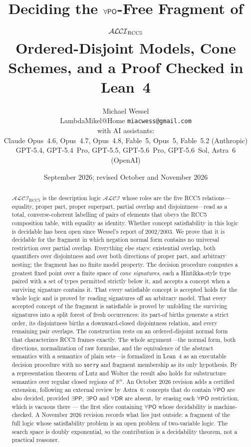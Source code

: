 \documentclass[11pt]{article}
\title{Deciding the $\forall\PO$-Free Fragment of $\ALCIRCC{5}$\\[0.35em]
\large Ordered-Disjoint Models, Cone Schemes, and a Proof Checked in Lean~4}
\author{Michael Wessel\\
\small LambdaMikel@Home \quad\textbullet\quad \texttt{miacwess@gmail.com}\\[0.45em]
\small with AI assistants:\\
\small Claude Opus~4.6, Opus~4.7, Opus~4.8, Fable~5, Opus~5, Fable~5.2 \;(Anthropic)\\
\small GPT-5.4, GPT-5.4~Pro, GPT-5.5, GPT-5.6~Pro, GPT-5.6~Sol, Astra~6 \;(OpenAI)}
\date{September 2026; revised October and November 2026}
\newcommand{\ALCIRCC}[1]{\mathcal{ALCI}_{\mathrm{RCC#1}}}
\newcommand{\ALCI}{\ensuremath{\mathcal{ALCI}}}
\newcommand{\DR}{\mathsf{DR}}
\newcommand{\PO}{\mathsf{PO}}
\newcommand{\PP}{\mathsf{PP}}
\newcommand{\reals}{\mathbb{R}}
\theoremstyle{plain}
\theoremstyle{definition}
\begin{document}
\maketitle

\begin{abstract}
$\ALCIRCC{5}$ is the description logic $\ALCI$ whose roles are the five RCC5
relations---equality, proper part, proper superpart, partial overlap and
disjointness---read as a total, converse-coherent labelling of pairs of
elements that obeys the RCC5 composition table, with equality as identity.
Whether concept satisfiability in this logic is decidable has been open since
Wessel's report of 2002/2003. We prove that it is decidable for the fragment
in which negation normal form contains no universal restriction over partial
overlap. Everything else stays: existential overlap, both quantifiers over
disjointness and over both directions of proper part, and arbitrary nesting;
the fragment has no finite model property. The decision procedure computes a
greatest fixed point over a finite space of \emph{cone signatures}, each a
Hintikka-style type paired with a set of types permitted strictly below it,
and accepts a concept when a surviving signature contains it. That every
satisfiable concept is accepted holds for the whole logic and is proved by
reading signatures off an arbitrary model. That every accepted concept of the
fragment is satisfiable is proved by unfolding the surviving signatures into a
split forest of fresh occurrences: its part-of births generate a strict order,
its disjointness births a downward-closed disjointness relation, and every
remaining pair overlaps. The construction rests on an
ordered-disjoint normal form that characterizes RCC5 frames exactly. The whole
argument---the normal form, both directions, normalization of raw formulas,
and the equivalence of the abstract semantics with a semantics of plain
sets---is formalized in Lean~4 as an executable decision procedure with no
\texttt{sorry} and fragment membership as its only hypothesis. By a
representation theorem of Lutz and Wolter the result also holds for
substructure semantics over regular closed regions of $\reals^n$. An October
2026 revision adds a certified extension, following an external review by
Astra~6: concepts that do contain $\forall\PO$ are also decided, provided
$\exists\PP$, $\exists\PO$ and $\forall\DR$ are absent, by erasing each
$\forall\PO$ restriction, which is vacuous there --- the first slice containing
$\forall\PO$ whose decidability is machine-checked. A November 2026 revision
records what lies just outside: a fragment of the full logic whose
satisfiability problem is an open problem of two-variable logic. The search
space is doubly exponential, so the contribution is a decidability theorem, not
a practical reasoner.
\end{abstract}
\end{document}
